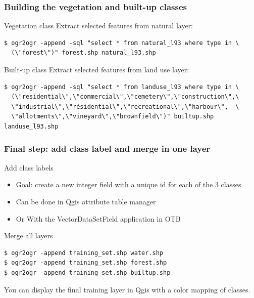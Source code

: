 \documentclass[8pt]{beamer}
\begin{document}
\begin{frame}[fragile]
\frametitle{Building the vegetation and built-up classes}
\begin{block}{Vegetation class}
Extract selected features from natural layer:
\begin{scriptsize}
\begin{verbatim}
$ ogr2ogr -append -sql "select * from natural_l93 where type in \
  (\"forest\")" forest.shp natural_l93.shp
\end{verbatim}
\end{scriptsize}
\end{block}

\begin{block}{Built-up class}
Extract selected features from land use layer:
\begin{scriptsize}
\begin{verbatim}
$ ogr2ogr -append -sql "select * from landuse_l93 where type in \
  (\"residential\",\"commercial\",\"cemetery\",\"construction\",\
  \"industrial\",\"résidential\",\"recreational\",\"harbour\",  \
  \"allotments\",\"vineyard\",\"brownfield\")" builtup.shp landuse_l93.shp
\end{verbatim}
\end{scriptsize}
\end{block}
\end{frame}

\begin{frame}[fragile]
\frametitle{Final step: add class label and merge in one layer}

\begin{block}{Add class labels}
\begin{itemize}
\item Goal: create a new integer field with a unique id for each of the 3 classes
\item Can be done in Qgis attribute table manager
\item Or With the VectorDataSetField application in OTB
\end{itemize}
\end{block}

\begin{block}{Merge all layers}
\begin{scriptsize}
\begin{verbatim}
$ ogr2ogr -append training_set.shp water.shp
$ ogr2ogr -append training_set.shp forest.shp
$ ogr2ogr -append training_set.shp builtup.shp
\end{verbatim}
\end{scriptsize}
\end{block}

You can display the final training layer in Qgis with a color mapping of classes.
\end{frame}
\end{document}
